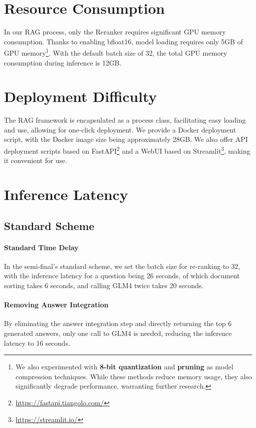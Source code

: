 \documentclass[11pt]{article}
\begin{document}
\section{Resource Consumption}

In our RAG process, only the Reranker requires significant GPU memory consumption. Thanks to enabling bfloat16, model loading requires only 5GB of GPU memory\footnote{We also experimented with \textbf{8-bit quantization} and \textbf{pruning} as model compression techniques. While these methods reduce memory usage, they also significantly degrade performance, warranting further research.}. With the default batch size of 32, the total GPU memory consumption during inference is 12GB.

\section{Deployment Difficulty}

The RAG framework is encapsulated as a process class, facilitating easy loading and use, allowing for one-click deployment. We provide a Docker deployment script, with the Docker image size being approximately 28GB. We also offer API deployment scripts based on FastAPI\footnote{\url{https://fastapi.tiangolo.com/}} and a WebUI based on Streamlit\footnote{\url{https://streamlit.io/}}, making it convenient for use.

\section{Inference Latency}

\subsection{Standard Scheme}

\paragraph{Standard Time Delay} In the semi-final's standard scheme, we set the batch size for re-ranking to 32, with the inference latency for a question being 26 seconds, of which document sorting takes 6 seconds, and calling GLM4 twice takes 20 seconds.

\paragraph{Removing Answer Integration} By eliminating the answer integration step and directly returning the top 6 generated answers, only one call to GLM4 is needed, reducing the inference latency to 16 seconds.
\end{document}
